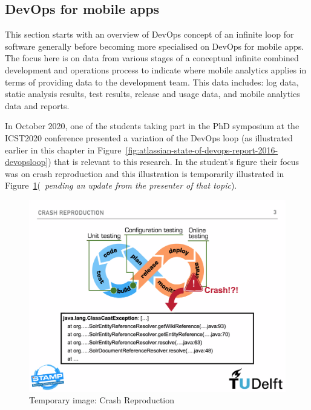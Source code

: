 \subsection{DevOps for mobile apps}
This section starts with an overview of DevOps concept of an infinite loop for software generally before becoming more specialised on DevOps for mobile apps. %
The focus here is on data from various stages of a conceptual infinite combined development and operations process to indicate where mobile analytics applies in terms of providing data to the development team. This data includes: log data, static analysis results, test results, release and usage data, and mobile analytics data and reports.

In October 2020, one of the students taking part in the PhD symposium at the ICST2020 conference presented a variation of the DevOps loop (as illustrated earlier in this chapter in Figure~\ref{fig:atlassian-state-of-devops-report-2016-devopsloop}) that is relevant to this research. In the student's figure their focus was on crash reproduction and this illustration is temporarily illustrated in Figure~\ref{fig:crash-reproduction-icst2020}(~\emph{pending an update from the presenter of that topic}).

\begin{figure}[htbp!]
    \centering
    \includegraphics[width=14cm]{images/icst-2020/crash-reproduction-icst2020.png}
    \caption{Temporary image: Crash Reproduction}
    \label{fig:crash-reproduction-icst2020}
\end{figure}

